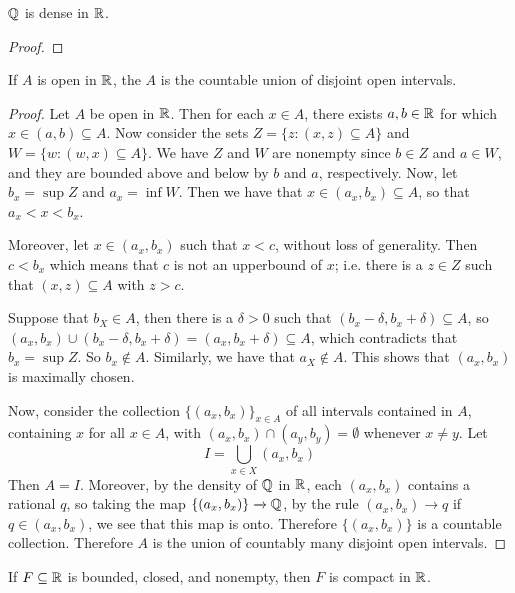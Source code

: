 \begin{lemma}\label{lemma_3.15}
    $\mathbb{Q}$ is dense in  $\mathbb{R}$.
\end{lemma}
\begin{proof}
\end{proof}

\begin{theorem}\label{thm_3.16}
    If $A$ is open in  $\mathbb{R}$, the  $A$ is the countable union of disjoint open
    intervals.
\end{theorem}
\begin{proof}
    Let $A$ be open in  $\mathbb{R}$. Then for each  $x \in A$, there exists  $a,b \in
    \mathbb{R}$ for which  $x \in (a,b) \subseteq A$. Now consider the sets $Z=\{z:(x,z)
    \subseteq A\}$ and $W=\{w:(w,x) \subseteq A\}$. We have $Z$ and  $W$ are
    nonempty since  $b \in Z$ and  $a \in W$, and they are bounded above and
    below by  $b$ and  $a$, respectively. Now, let $b_x=\sup{Z}$ and
    $a_x=\inf{W}$. Then we have that $x \in (a_x,b_x) \subseteq A$, so that
    $a_x<x<b_x$.

    Moreover, let $x \in (a_x,b_x)$ such that $x<c$, without loss of generality.
    Then $c<b_x$ which means that $c$ is not an upperbound of $x$; i.e. there is
    a $z \in Z$ such that  $(x,z) \subseteq A$ with $z>c$.

    Suppose that $b_X \in A$, then there is a  $\delta>0$ such that
    $(b_x-\delta, b_x+\delta) \subseteq A$, so $(a_x,b_x) \cup
    (b_x-\delta,b_x+\delta)=(a_x,b_x+\delta) \subseteq A$, which contradicts
    that $b_x=\sup{Z}$. So $b_x \notin A$. Similarly, we have that $a_X \notin
    A$. This shows that $(a_x,b_x)$ is maximally chosen.

    Now, consider the collection $\{(a_x,b_x)\}_{x \in A}$ of all intervals
    contained in $A$, containing $x$ for all $x \in A$,  with $(a_x,b_x) \cap
    (a_y,b_y)=\emptyset$ whenever $x \neq y$. Let
    \begin{equation*}
        I=\bigcup_{x \in X}{(a_x,b_x)}
    \end{equation*}
    Then $A=I$. Moreover, by the density of $\mathbb{Q}$ in  $\mathbb{R}$, each  $(a_x,b_x)$
    contains a rational $q$, so taking the map $\{(a_x,b_x)\} \xrightarrow{}
    \mathbb{Q}$, by the rule $(a_x,b_x) \xrightarrow{} q$ if $q \in (a_x,b_x)$, we see
    that this map is onto. Therefore $\{(a_x,b_x)\}$ is a countable collection.
    Therefore $A$ is the union of countably many disjoint open intervals.
\end{proof}

\begin{theorem}\label{thm_3.17}
    If $F \subseteq \mathbb{R}$ is bounded, closed, and nonempty, then  $F$ is compact
    in  $\mathbb{R}$.
\end{theorem}

